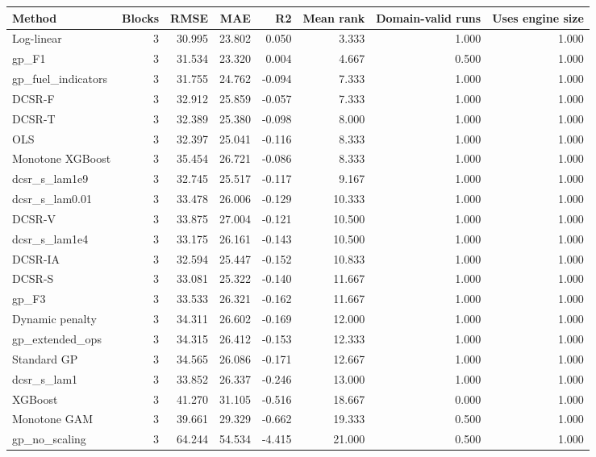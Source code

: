 \begin{tabular}{lrrrrrrr}
\toprule
Method & Blocks & RMSE & MAE & R2 & Mean rank & Domain-valid runs & Uses engine size \\
\midrule
Log-linear & 3 & 30.995 & 23.802 & 0.050 & 3.333 & 1.000 & 1.000 \\
gp\_F1 & 3 & 31.534 & 23.320 & 0.004 & 4.667 & 0.500 & 1.000 \\
gp\_fuel\_indicators & 3 & 31.755 & 24.762 & -0.094 & 7.333 & 1.000 & 1.000 \\
DCSR-F & 3 & 32.912 & 25.859 & -0.057 & 7.333 & 1.000 & 1.000 \\
DCSR-T & 3 & 32.389 & 25.380 & -0.098 & 8.000 & 1.000 & 1.000 \\
OLS & 3 & 32.397 & 25.041 & -0.116 & 8.333 & 1.000 & 1.000 \\
Monotone XGBoost & 3 & 35.454 & 26.721 & -0.086 & 8.333 & 1.000 & 1.000 \\
dcsr\_s\_lam1e9 & 3 & 32.745 & 25.517 & -0.117 & 9.167 & 1.000 & 1.000 \\
dcsr\_s\_lam0.01 & 3 & 33.478 & 26.006 & -0.129 & 10.333 & 1.000 & 1.000 \\
DCSR-V & 3 & 33.875 & 27.004 & -0.121 & 10.500 & 1.000 & 1.000 \\
dcsr\_s\_lam1e4 & 3 & 33.175 & 26.161 & -0.143 & 10.500 & 1.000 & 1.000 \\
DCSR-IA & 3 & 32.594 & 25.447 & -0.152 & 10.833 & 1.000 & 1.000 \\
DCSR-S & 3 & 33.081 & 25.322 & -0.140 & 11.667 & 1.000 & 1.000 \\
gp\_F3 & 3 & 33.533 & 26.321 & -0.162 & 11.667 & 1.000 & 1.000 \\
Dynamic penalty & 3 & 34.311 & 26.602 & -0.169 & 12.000 & 1.000 & 1.000 \\
gp\_extended\_ops & 3 & 34.315 & 26.412 & -0.153 & 12.333 & 1.000 & 1.000 \\
Standard GP & 3 & 34.565 & 26.086 & -0.171 & 12.667 & 1.000 & 1.000 \\
dcsr\_s\_lam1 & 3 & 33.852 & 26.337 & -0.246 & 13.000 & 1.000 & 1.000 \\
XGBoost & 3 & 41.270 & 31.105 & -0.516 & 18.667 & 0.000 & 1.000 \\
Monotone GAM & 3 & 39.661 & 29.329 & -0.662 & 19.333 & 0.500 & 1.000 \\
gp\_no\_scaling & 3 & 64.244 & 54.534 & -4.415 & 21.000 & 0.500 & 1.000 \\
\bottomrule
\end{tabular}

